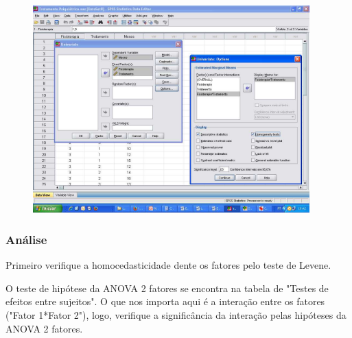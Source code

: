			\begin{figure}[H]
			
				\centering
				\includegraphics[height=8cm]{images/anova2_passo-a-passo_3}
			\end{figure}
		\subsubsection{Análise}

			Primeiro verifique a homocedasticidade dente os fatores pelo teste de Levene.

			O teste de hipótese da ANOVA 2 fatores se encontra na tabela de "Testes de efeitos entre sujeitos". O que nos importa aqui é a interação entre os fatores ("Fator 1*Fator 2"), logo, verifique a significância da interação pelas hipóteses da ANOVA 2 fatores.